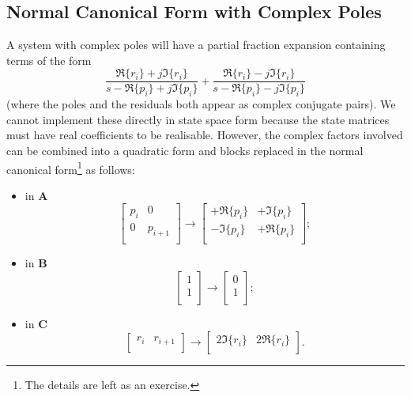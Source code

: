 \subsection*{Normal Canonical Form with Complex Poles}
A system with complex poles will have a partial fraction expansion
containing terms of the form
\[\frac{\Re\{ r_i\} + j\Im\{ r_i\}}{s - \Re\{p_i\} + j\Im\{p_i\}} + \frac{\Re\{r_i\} - j\Im\{ r_i\}}{s - \Re\{p_i\} - j\Im\{p_i\}} \]
(where the poles and the residuals both appear as complex
conjugate pairs). We cannot implement these directly in state
space form because the state matrices must have real coefficients
to be realisable. However, the complex factors involved can be
combined into a quadratic form and blocks replaced in the normal
canonical form\footnote{The details are left as an exercise.} as
follows:
\begin{itemize}
  \item in $\mathbf{A}$ \[\left[\begin{array}{cc}
    p_i & 0 \\
    0 & p_{i+1} \\
  \end{array}\right] \rightarrow \left[\begin{array}{cc}
    +\Re\{p_i\} & +\Im\{p_i\} \\
    -\Im\{p_i\} & +\Re\{p_i\} \\
  \end{array}\right];\]
  \item in $\mathbf{B}$ \[\left[\begin{array}{c}
    1 \\
    1  \\
  \end{array}\right] \rightarrow \left[\begin{array}{c}
    0 \\
    1 \\
  \end{array}\right];\]
    \item in $\mathbf{C}$ \[\left[\begin{array}{cc}
    r_i & r_{i+1}\\
  \end{array}\right] \rightarrow \left[\begin{array}{cc}
    2\Im\{r_{i}\} & 2\Re\{r_i\}\\
  \end{array}\right].\]
\end{itemize}
